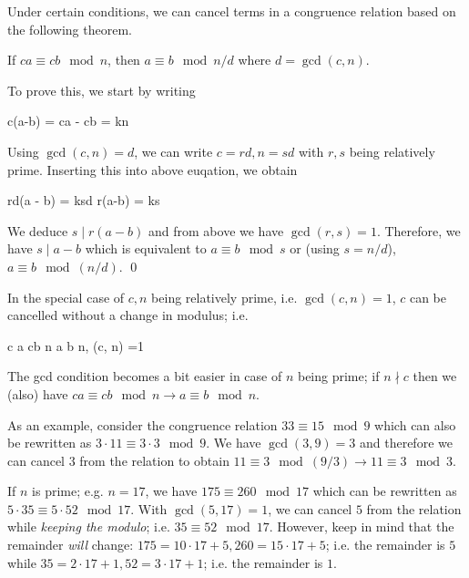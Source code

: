 Under certain conditions, we can cancel terms in a congruence relation based on the following theorem.

\begin{theorem}\label{2020-11-17:th3}
    If $ca \equiv cb \mod n$, then $a \equiv b \mod n/d$ where $d = \gcd(c, n)$.
\end{theorem}

To prove this, we start by writing

\bee
c(a-b) = ca - cb = kn
\eee

Using $\gcd(c,n) = d$, we can write $c = rd, n = sd$ with $r, s$ being relatively prime. Inserting this into above euqation, we obtain

\bee
rd(a - b) = ksd \rightarrow r(a-b) = ks
\eee

We deduce $s \mid r(a-b)$ and from above we have $\gcd(r,s) = 1$. Therefore, we have $s \mid a-b$ which is equivalent to $a \equiv b \mod s$ or (using $s = n/d$), $a \equiv b \mod (n/d)$. \qed

In the special case of $c, n$ being relatively prime, i.e. $\gcd(c, n) = 1$, $c$ can be cancelled without a change in modulus; i.e.

\bee
c a \equiv cb \mod n \rightarrow a \equiv b \mod n, \quad {} \gcd(c, n) =1
\eee

The gcd condition becomes a bit easier in case of $n$ being prime; if $n \nmid c$ then we (also) have $c a \equiv cb \mod n \rightarrow a \equiv b \mod n$.

As an example, consider the congruence relation $33 \equiv 15 \mod 9$ which can also be rewritten as $3 \cdot 11 \equiv 3 \cdot 3 \mod 9$. We have $\gcd(3, 9) = 3$ and therefore we can cancel $3$ from the relation to obtain $11 \equiv 3 \mod (9/3) \rightarrow 11 \equiv 3 \mod 3$.

If $n$ is prime; e.g. $n = 17$, we have $175 \equiv 260 \mod 17$ which can be rewritten as $5 \cdot 35 \equiv 5 \cdot 52 \mod 17$. With $\gcd(5, 17) = 1$, we can cancel $5$ from the relation while \emph{keeping the modulo}; i.e. $35 \equiv 52 \mod 17$. However, keep in mind that the remainder \emph{will} change: $175 = 10 \cdot 17 + 5, 260 = 15 \cdot 17 + 5$; i.e. the remainder is $5$ while $35 = 2 \cdot 17 + 1, 52 = 3 \cdot 17 + 1$; i.e. the remainder is $1$.


